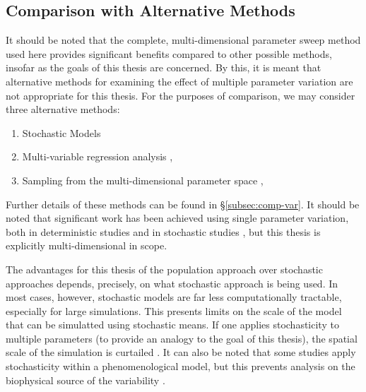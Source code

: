 \documentclass[../thesis-main.tex]{subfiles}
\begin{document}
\subsection{Comparison with Alternative Methods}
\label{subsec:alt-methods}
It should be noted that the complete, multi-dimensional parameter sweep method used here provides significant benefits compared to other possible methods, insofar as the goals of this thesis are concerned. By this, it is meant that alternative methods for examining the effect of multiple parameter variation are not appropriate for this thesis. For the purposes of comparison, we may consider three alternative methods:
\begin{enumerate}
 \item Stochastic Models \citep{Heijman2013} \label{list:stochastic}
 \item Multi-variable regression analysis \citep{Sobie2009, Sobie2011, Sarkar2010, Sarkar2011}, \label{list:regression}
 \item Sampling from the multi-dimensional parameter space \citep{Britton2013}, \label{list:multi-sample}
\end{enumerate}
Further details of these methods can be found in \S\ref{subsec:comp-var}. It should be noted that significant work has been achieved using single parameter variation, both in deterministic studies \citep{Romero2009, Romero2011} and in stochastic studies \citep{Pueyo2011, Hashambhoy2011, Sato2009, Tanskanen2005}, but this thesis is explicitly multi-dimensional in scope.

The advantages for this thesis of the population approach over stochastic approaches depends, precisely, on what stochastic approach is being used. In most cases, however, stochastic models are far less computationally tractable, especially for large simulations. This presents limits on the scale of the model that can be simulatted using stochastic means. If one applies stochasticity to multiple parameters (to provide an analogy to the goal of this thesis), the spatial scale of the simulation is curtailed \citep{Heijman2013}. It can also be noted that some studies apply stochasticity within a phenomenological model, but this prevents analysis on the biophysical source of the variability \citep{Walmsley2010}.
\end{document}
